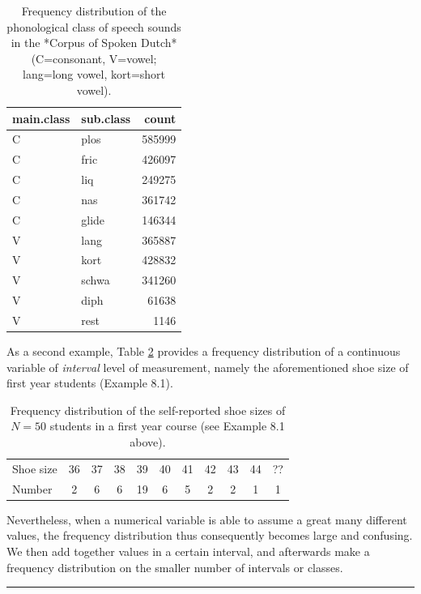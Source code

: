 \documentclass[
]{book}
\begin{document}
\begin{table}

\caption{\label{tab:klankfreq}Frequency distribution 
              of the phonological class of speech sounds
              in the *Corpus of Spoken Dutch* 
              (C=consonant, V=vowel; lang=long vowel, kort=short vowel).}
\centering
\begin{tabular}[t]{llr}
\toprule
main.class & sub.class & count\\
\midrule
C & plos & 585999\\
C & fric & 426097\\
C & liq & 249275\\
C & nas & 361742\\
C & glide & 146344\\
\addlinespace
V & lang & 365887\\
V & kort & 428832\\
V & schwa & 341260\\
V & diph & 61638\\
V & rest & 1146\\
\bottomrule
\end{tabular}
\end{table}

As a second example, Table \ref{tab:shoesize} provides a
frequency distribution of a continuous variable of \emph{interval}
level of measurement, namely the aforementioned shoe size
of first year students (Example 8.1).

\begin{longtable}[]{@{}lcccccccccc@{}}
\caption{\label{tab:shoesize} Frequency distribution of the self-reported shoe sizes of \(N=50\) students in a first year course (see Example 8.1 above).}\tabularnewline
\toprule\noalign{}
\endfirsthead
\endhead
\bottomrule\noalign{}
\endlastfoot
Shoe size & 36 & 37 & 38 & 39 & 40 & 41 & 42 & 43 & 44 & ?? \\
Number & 2 & 6 & 6 & 19 & 6 & 5 & 2 & 2 & 1 & 1 \\
\end{longtable}

Nevertheless, when a numerical variable is able to assume a great many different
values, the frequency distribution thus consequently becomes large and confusing.
We then add together values in a certain interval,
and afterwards make a frequency distribution on the smaller number
of intervals or classes.

\begin{center}\rule{0.5\linewidth}{0.5pt}\end{center}
\end{document}
